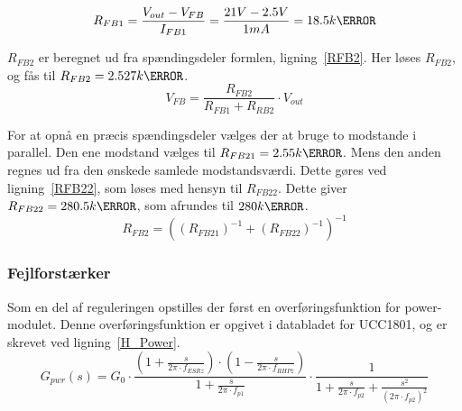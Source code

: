 \begin{equation} \label{RFB1}
R_{FB1} = \frac{V_{out}-V_{FB}}{I_{FB1}} = \frac{21V-2.5V}{1mA} = 18.5k\ohm
\end{equation}

\noindent $R_{FB2}$ er beregnet ud fra spændingsdeler formlen, ligning~\ref{RFB2}. Her løses $R_{FB2}$, og fås til $R_{FB2}=2.527k \ohm$.  
\begin{equation} \label{RFB2}
V_{FB} = \frac{R_{FB2}}{R_{FB1} + R_{RB2}} \cdot V_{out}
\end{equation}

For at opnå en præcis spændingsdeler vælges der at bruge to modstande i parallel. Den ene modstand vælges til $R_{FB21}=2.55k\ohm$. Mens den anden regnes ud fra den ønskede samlede modstandsværdi. Dette gøres ved ligning~\ref{RFB22}, som løses med hensyn til $R_{FB22}$. Dette giver $R_{FB22}=280.5k\ohm$, som afrundes til $280k\ohm$.
\begin{equation} \label{RFB22}
R_{FB2} = ((R_{FB21})^{-1} + (R_{FB22})^{-1})^{-1}
\end{equation}

\subsubsection{Fejlforstærker}
Som en del af reguleringen opstilles der først en overføringsfunktion for power-modulet. Denne overføringsfunktion er opgivet i databladet for UCC1801, og er skrevet ved ligning~\ref{H_Power}.
\begin{equation} \label{H_Power}
G_{pwr}(s) = G_0 \cdot \frac{(1+\frac{s}{2\pi \cdot f_{ESRz}}) \cdot (1-\frac{s}{2\pi \cdot f_{RHPz}})}{1+\frac{s}{2\pi \cdot f_{p1}}} \cdot \frac{1}{1 + \frac{s}{2\pi \cdot f_{p2}} + \frac{s^2}{(2\pi \cdot f_{p2})^2}}
\end{equation}

